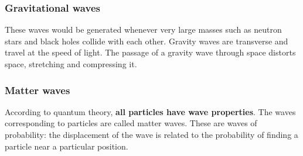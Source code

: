 \subsubsection*{Gravitational waves}
These waves would be generated whenever very large masses such as neutron stars and black holes collide with each other. Gravity waves are transverse and travel at the speed of light. The passage of a gravity wave through space distorts space, stretching and compressing it. 
\begin{center}
\end{center}
\subsubsection*{Matter waves}
According to quantum theory, \textbf{all particles have wave properties}. The waves corresponding to particles are called matter waves. These are waves of probability: the displacement of the wave is related to the probability of finding a particle near a particular position.
